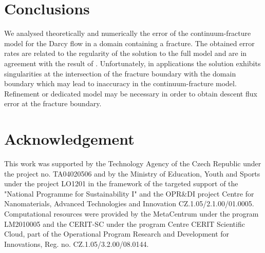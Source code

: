 \documentclass{llncs}
\renewcommand{\note}[2]{{\color{blue} \textbf{ #1:} \textit{#2}}}
\begin{document}
\section{Conclusions}

We analysed theoretically and numerically the error of the continuum-fracture model for the Darcy flow in a domain containing a fracture.
The obtained error rates are related to the regularity of the solution to the full model and are in agreement with the result of \cite{martin_modeling_2005}.
Unfortunately, in applications the solution exhibits singularities at the intersection of the fracture boundary with the domain boundary 
which may lead to inaccuracy in the continuum-fracture model. Refinement or dedicated model may be necessary in order to obtain descent 
flux error at the fracture boundary.







\section*{Acknowledgement}
This work was supported by the Technology Agency of the Czech Republic under the
project no. TA04020506 and by the Ministry of Education, Youth and Sports under the project LO1201 in the framework of the targeted support of the "National Programme for Sustainability I" and the OPR\&DI project Centre for Nanomaterials, Advanced Technologies and Innovation CZ.1.05/2.1.00/01.0005.
Computational resources were provided by the MetaCentrum under the program LM2010005
and the CERIT-SC under the program Centre CERIT Scientific Cloud,
part of the Operational Program Research and Development for Innovations, Reg. no. CZ.1.05/3.2.00/08.0144.




\end{document}
